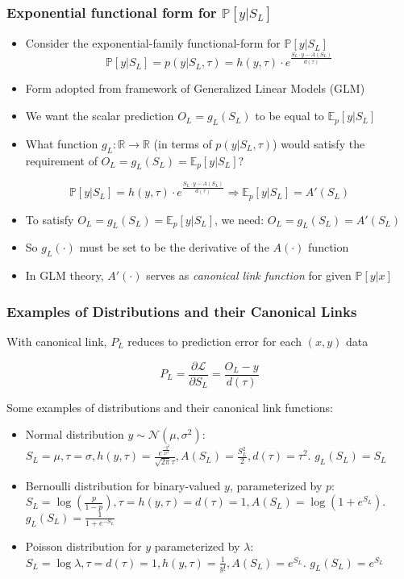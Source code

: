 \documentclass{beamer}
\begin{document}
\begin{frame}
\frametitle{Exponential functional form for $\mathbb{P}[y|S_L]$}
\pause
\begin{itemize}[<+->]
\item Consider the exponential-family functional-form for $\mathbb{P}[y|S_L]$
$$\mathbb{P}[y|S_L] = p(y|S_L, \tau) = h(y, \tau) \cdot e^{\frac {S_L \cdot y - A(S_L)} {d(\tau)}}$$
\item Form adopted from framework of Generalized Linear Models (GLM)
\item We want the scalar prediction $O_L = g_L(S_L)$ to be equal to $\mathbb{E}_p[y|S_L]$
\item What function $g_L: \mathbb{R} \rightarrow \mathbb{R}$ (in terms of $p(y|S_L, \tau)$) would satisfy the requirement of $O_L = g_L(S_L) = \mathbb{E}_p[y|S_L]$?
\end{itemize}
\pause
\begin{lemma}
$$\mathbb{P}[y|S_L] = h(y, \tau) \cdot e^{\frac {S_L \cdot y - A(S_L)} {d(\tau)}} \Rightarrow \mathbb{E}_p[y|S_L] = A'(S_L)$$
\end{lemma}
\pause
\begin{itemize}[<+->]
\item To satisfy $O_L = g_L(S_L) = \mathbb{E}_p[y|S_L]$, we need: $O_L = g_L(S_L) = A'(S_L)$
\item So $g_L(\cdot)$ must be set to be the derivative of the $A(\cdot)$ function
\item In GLM theory, $A'(\cdot)$ serves as {\em canonical link function} for given $\mathbb{P}[y|x]$
\end{itemize}
\end{frame}

\begin{frame}
\frametitle{Examples of Distributions and their Canonical Links}
With canonical link, $P_L$ reduces to prediction error for each $(x,y)$ data
\begin{theorem}
$$P_L =  \frac {\partial \mathcal{L}}{\partial S_L} = \frac {O_L - y} {d(\tau)}$$
\end{theorem}
\pause
Some examples of distributions and their canonical link functions:
\begin{itemize}
\item Normal distribution $y \sim \mathcal{N}(\mu, \sigma^2)$: $S_L = \mu, \tau = \sigma, h(y, \tau) = \frac {e^{\frac {-y^2} {2 \tau^2}}} {\sqrt{2 \pi} \tau}, A(S_L) = \frac {S_L^2} {2}, d(\tau) = \tau^2$. $g_L(S_L) = S_L$
\item Bernoulli distribution for binary-valued $y$, parameterized by $p$: $S_L = \log{(\frac p {1-p})}, \tau = h(y, \tau) = d(\tau) = 1, A(S_L) = \log{(1+e^{S_L})}$. $g_L(S_L) = \frac 1 {1+e^{-S_L}}$
\item Poisson distribution for $y$ parameterized by $\lambda$:
$S_L = \log{\lambda}, \tau = d(\tau) = 1, h(y, \tau) = \frac 1 {y!}, A(S_L) = e^{S_L}$.  $g_L(S_L) = e^{S_L}$
\end{itemize}
\end{frame}
\end{document}
